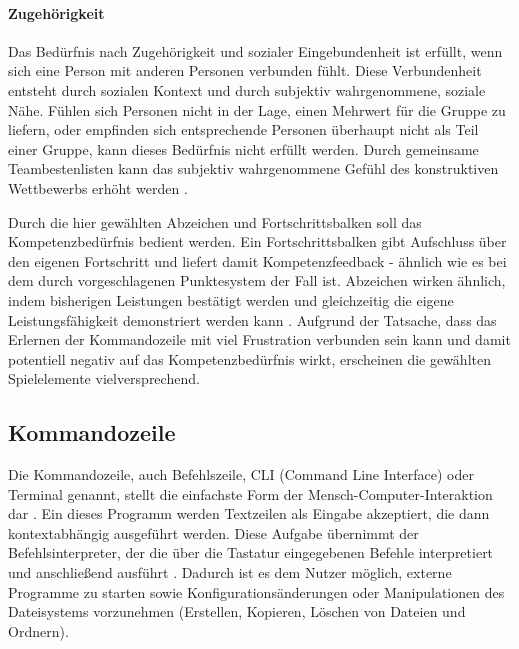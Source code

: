 \paragraph{Zugehörigkeit}
Das Bedürfnis nach Zugehörigkeit und sozialer Eingebundenheit ist erfüllt, wenn sich eine Person mit anderen Personen verbunden fühlt. Diese Verbundenheit entsteht durch sozialen Kontext und durch subjektiv wahrgenommene, soziale Nähe. Fühlen sich Personen nicht in der Lage, einen Mehrwert für die Gruppe zu liefern, oder empfinden sich entsprechende Personen überhaupt nicht als Teil einer Gruppe, kann dieses Bedürfnis nicht erfüllt werden. Durch gemeinsame Teambestenlisten kann das subjektiv wahrgenommene Gefühl des konstruktiven Wettbewerbs erhöht werden \cite{sailer2016wirkung}.


Durch die hier gewählten Abzeichen und Fortschrittsbalken soll das Kompetenzbedürfnis bedient werden. Ein Fortschrittsbalken gibt Aufschluss über den eigenen Fortschritt und liefert damit Kompetenzfeedback - ähnlich wie es bei dem durch  vorgeschlagenen Punktesystem der Fall ist. Abzeichen wirken ähnlich, indem bisherigen Leistungen bestätigt werden und gleichzeitig die eigene Leistungsfähigkeit demonstriert werden kann \cite{antin_badges_2011}. Aufgrund der Tatsache, dass das Erlernen der Kommandozeile mit viel Frustration verbunden sein kann und damit potentiell negativ auf das Kompetenzbedürfnis wirkt, erscheinen die gewählten Spielelemente vielversprechend.

\subsection{Kommandozeile}
Die Kommandozeile, auch Befehlszeile, CLI (Command Line Interface) oder Terminal genannt, stellt die einfachste Form der Mensch-Computer-Interaktion dar \cite{Kumar2005}. Ein dieses Programm werden Textzeilen als Eingabe akzeptiert, die dann kontextabhängig ausgeführt werden. Diese Aufgabe übernimmt der Befehlsinterpreter, der die über die Tastatur eingegebenen Befehle interpretiert und anschließend ausführt \cite{wissen_interpreter}. 
Dadurch ist es dem Nutzer möglich, externe Programme zu starten sowie Konfigurationsänderungen oder Manipulationen des Dateisystems vorzunehmen (Erstellen, Kopieren, Löschen von Dateien und Ordnern).

